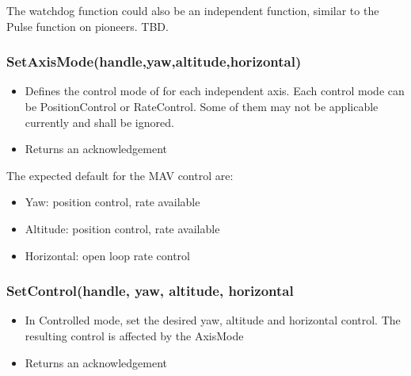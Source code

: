 \documentclass{article}
\begin{document}
The watchdog function could also be an independent function, similar to the
Pulse function on pioneers. TBD.

\subsubsection{SetAxisMode(handle,yaw,altitude,horizontal)}
\begin{itemize}
\item Defines the control mode of for each independent axis. Each control mode
can be PositionControl or RateControl. Some of them may not be applicable
currently and shall be ignored. 
\item Returns an acknowledgement
\end{itemize}
The expected default for the MAV control are:
\begin{itemize}
\item Yaw: position control, rate available
\item Altitude: position control, rate available
\item Horizontal: open loop rate control
\end{itemize}

\subsubsection{SetControl(handle, yaw, altitude, horizontal}
\begin{itemize}
\item In Controlled mode, set the desired yaw, altitude and horizontal control.
The resulting control is affected by the AxisMode
\item Returns an acknowledgement
\end{itemize}
\end{document}
